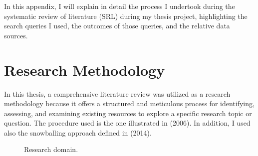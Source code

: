 In this appendix, I will explain in detail the process I undertook during the systematic review of literature (SRL) during my thesis project, highlighting the search queries I used, the outcomes of those queries, and the relative data sources. 

\section{Research Methodology}
\label{sec:resmetodologies}
In this thesis, a comprehensive literature review was utilized as a research methodology because it offers a structured and meticulous process for identifying, assessing, and examining existing resources to explore a specific research topic or question. The procedure used is the one illustrated in \citeauthor{budgen_performing_2006} (2006). In addition, I used also the snowballing approach defined in \citeauthor{wohlin_guidelines_2014} (2014).
\begin{figure}
\begin{center}
\end{center}
\caption{Research domain.} \label{fig:resdomains}
\end{figure}


